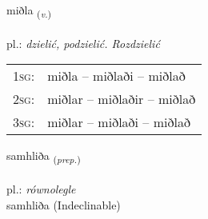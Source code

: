 \documentclass[frontgrid, backgrid]{flacards}\usepackage[]{graphicx}\usepackage[]{xcolor}
\begin{document}
\renewcommand{\flhead}{\vskip5pt \fboxsep=0pt {\small\bfseries\footnotesize Sagnorð | Verb}}
\renewcommand{\fcfoot}{\vskip5pt \fboxsep=0pt \hspace{2pt}{\small\bfseries\footnotesize 2K}}

\renewcommand{\blhead}{\vskip5pt {\small\bfseries\footnotesize Sagnorð | Verb }}
\renewcommand{\bcfoot}{\vskip5pt \hspace{2pt}{\small\bfseries\footnotesize 2K}}


{miðla \small{\textsubscript{(\textit{v.})}} \\[1ex] %
\textphonetic{[mɪðla]} \\
pl.: \emph{dzielić, podzielić. Rozdzielić} \\  [2ex]
\renewcommand*{\arraystretch}{0.8}
\begin{tabular}{p{1cm}l}
\textsc{1sg}: & miðla -- miðlaði -- miðlað \\ 
\textsc{2sg}: & miðlar -- miðlaðir -- miðlað \\ 
\textsc{3sg}: & miðlar -- miðlaði -- miðlað \\ 
\end{tabular}
}


\renewcommand{\flhead}{\vskip5pt \fboxsep=0pt {\small\bfseries\footnotesize Forsetning | Preposition}}
\renewcommand{\fcfoot}{\vskip5pt \fboxsep=0pt \hspace{2pt}{\small\bfseries\footnotesize 2K}}

\renewcommand{\blhead}{\vskip5pt {\small\bfseries\footnotesize Forsetning | Preposition }}
\renewcommand{\bcfoot}{\vskip5pt \hspace{2pt}{\small\bfseries\footnotesize 2K}}


{samhliða \small{\textsubscript{(\textit{prep.})}} \\[1ex]
 \\
pl.: \emph{równolegle} \\  [2ex]
samhliða (Indeclinable)}
\end{document}
